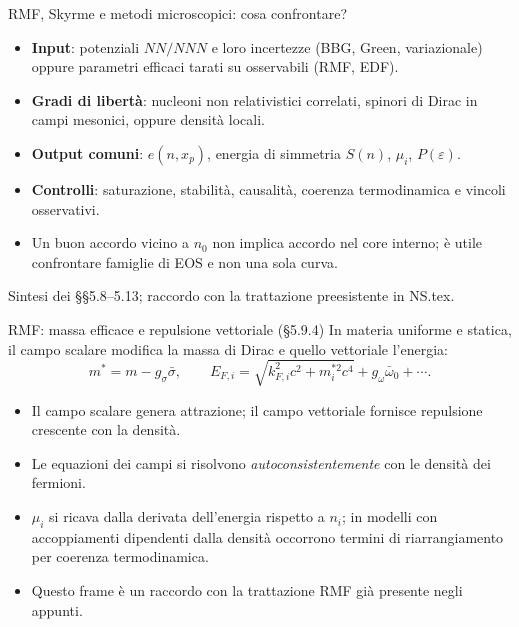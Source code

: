 \begin{frame}[t]{RMF, Skyrme e metodi microscopici: cosa confrontare?}
\small
\begin{itemize}
\item \textbf{Input}: potenziali $NN/NNN$ e loro incertezze (BBG, Green, variazionale) oppure parametri efficaci tarati su osservabili (RMF, EDF).
\item \textbf{Gradi di libertà}: nucleoni non relativistici correlati, spinori di Dirac in campi mesonici, oppure densità locali.
\item \textbf{Output comuni}: $e(n,x_p)$, energia di simmetria $S(n)$, $\mu_i$, $P(\varepsilon)$.
\item \textbf{Controlli}: saturazione, stabilità, causalità, coerenza termodinamica e vincoli osservativi.
\item Un buon accordo vicino a $n_0$ non implica accordo nel core interno; è utile confrontare famiglie di EOS e non una sola curva.
\end{itemize}
{\footnotesize Sintesi dei §§5.8--5.13; raccordo con la trattazione preesistente in NS.tex.}
\end{frame}

\begin{frame}[t]{RMF: massa efficace e repulsione vettoriale (§5.9.4)}
\small
In materia uniforme e statica, il campo scalare modifica la massa di Dirac e quello vettoriale l'energia:
\[
m^*=m-g_\sigma\bar\sigma,\qquad
E_{F,i}=\sqrt{k_{F,i}^2c^2+m_i^{*2}c^4}+g_\omega\bar\omega_0+\cdots.
\]
\begin{itemize}
\item Il campo scalare genera attrazione; il campo vettoriale fornisce repulsione crescente con la densità.
\item Le equazioni dei campi si risolvono \emph{autoconsistentemente} con le densità dei fermioni.
\item $\mu_i$ si ricava dalla derivata dell'energia rispetto a $n_i$; in modelli con accoppiamenti dipendenti dalla densità occorrono termini di riarrangiamento per coerenza termodinamica.
\item Questo frame è un raccordo con la trattazione RMF già presente negli appunti.
\end{itemize}
\end{frame}

